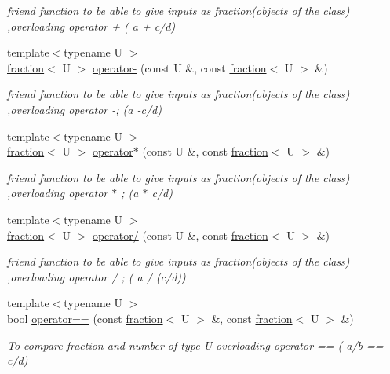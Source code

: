 \begin{DoxyCompactItemize}
\begin{DoxyCompactList}\small\item\em friend function to be able to give inputs as fraction(objects of the class) ,overloading operator + ( a + c/d) \end{DoxyCompactList}\item 
{\footnotesize template$<$typename U $>$ }\\\hyperlink{classfraction}{fraction}$<$ U $>$ \hyperlink{classfraction_a8962a9c6f5c90b25df78217174f80074}{operator-\/} (const U \&, const \hyperlink{classfraction}{fraction}$<$ U $>$ \&)
\begin{DoxyCompactList}\small\item\em friend function to be able to give inputs as fraction(objects of the class) ,overloading operator -\/; (a -\/c/d) \end{DoxyCompactList}\item 
{\footnotesize template$<$typename U $>$ }\\\hyperlink{classfraction}{fraction}$<$ U $>$ \hyperlink{classfraction_a5689faf050fe7611e58b5285f3571d25}{operator$\ast$} (const U \&, const \hyperlink{classfraction}{fraction}$<$ U $>$ \&)
\begin{DoxyCompactList}\small\item\em friend function to be able to give inputs as fraction(objects of the class) ,overloading operator $\ast$ ; (a $\ast$ c/d) \end{DoxyCompactList}\item 
{\footnotesize template$<$typename U $>$ }\\\hyperlink{classfraction}{fraction}$<$ U $>$ \hyperlink{classfraction_a78fa3a599aa5341bfd786191ab02aa68}{operator/} (const U \&, const \hyperlink{classfraction}{fraction}$<$ U $>$ \&)
\begin{DoxyCompactList}\small\item\em friend function to be able to give inputs as fraction(objects of the class) ,overloading operator / ; ( a / (c/d)) \end{DoxyCompactList}\item 
{\footnotesize template$<$typename U $>$ }\\bool \hyperlink{classfraction_a5757e7b3d62bd8e890d23edd4c39f3d3}{operator==} (const \hyperlink{classfraction}{fraction}$<$ U $>$ \&, const \hyperlink{classfraction}{fraction}$<$ U $>$ \&)
\begin{DoxyCompactList}\small\item\em To compare fraction and number of type U overloading operator == ( a/b == c/d) \end{DoxyCompactList}\item 

\end{DoxyCompactItemize}
